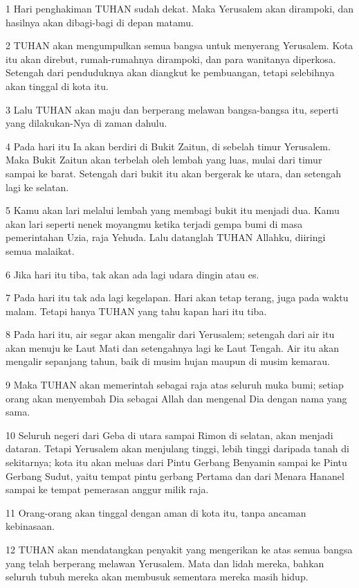 \par 1 Hari penghakiman TUHAN sudah dekat. Maka Yerusalem akan dirampoki, dan hasilnya akan dibagi-bagi di depan matamu.
\par 2 TUHAN akan mengumpulkan semua bangsa untuk menyerang Yerusalem. Kota itu akan direbut, rumah-rumahnya dirampoki, dan para wanitanya diperkosa. Setengah dari penduduknya akan diangkut ke pembuangan, tetapi selebihnya akan tinggal di kota itu.
\par 3 Lalu TUHAN akan maju dan berperang melawan bangsa-bangsa itu, seperti yang dilakukan-Nya di zaman dahulu.
\par 4 Pada hari itu Ia akan berdiri di Bukit Zaitun, di sebelah timur Yerusalem. Maka Bukit Zaitun akan terbelah oleh lembah yang luas, mulai dari timur sampai ke barat. Setengah dari bukit itu akan bergerak ke utara, dan setengah lagi ke selatan.
\par 5 Kamu akan lari melalui lembah yang membagi bukit itu menjadi dua. Kamu akan lari seperti nenek moyangmu ketika terjadi gempa bumi di masa pemerintahan Uzia, raja Yehuda. Lalu datanglah TUHAN Allahku, diiringi semua malaikat.
\par 6 Jika hari itu tiba, tak akan ada lagi udara dingin atau es.
\par 7 Pada hari itu tak ada lagi kegelapan. Hari akan tetap terang, juga pada waktu malam. Tetapi hanya TUHAN yang tahu kapan hari itu tiba.
\par 8 Pada hari itu, air segar akan mengalir dari Yerusalem; setengah dari air itu akan menuju ke Laut Mati dan setengahnya lagi ke Laut Tengah. Air itu akan mengalir sepanjang tahun, baik di musim hujan maupun di musim kemarau.
\par 9 Maka TUHAN akan memerintah sebagai raja atas seluruh muka bumi; setiap orang akan menyembah Dia sebagai Allah dan mengenal Dia dengan nama yang sama.
\par 10 Seluruh negeri dari Geba di utara sampai Rimon di selatan, akan menjadi dataran. Tetapi Yerusalem akan menjulang tinggi, lebih tinggi daripada tanah di sekitarnya; kota itu akan meluas dari Pintu Gerbang Benyamin sampai ke Pintu Gerbang Sudut, yaitu tempat pintu gerbang Pertama dan dari Menara Hananel sampai ke tempat pemerasan anggur milik raja.
\par 11 Orang-orang akan tinggal dengan aman di kota itu, tanpa ancaman kebinasaan.
\par 12 TUHAN akan mendatangkan penyakit yang mengerikan ke atas semua bangsa yang telah berperang melawan Yerusalem. Mata dan lidah mereka, bahkan seluruh tubuh mereka akan membusuk sementara mereka masih hidup.
